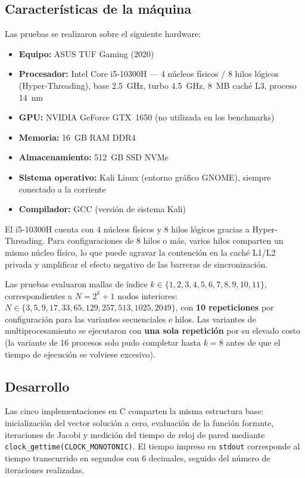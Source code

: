 \documentclass{article}
\begin{document}
\subsection{Características de la máquina}

Las pruebas se realizaron sobre el siguiente hardware:

\begin{itemize}
  \item \textbf{Equipo:} ASUS TUF Gaming (2020)
  \item \textbf{Procesador:} Intel Core i5-10300H --- 4 núcleos físicos / 8
    hilos lógicos (Hyper-Threading), base 2.5~GHz, turbo 4.5~GHz, 8~MB caché
    L3, proceso 14~nm
  \item \textbf{GPU:} NVIDIA GeForce GTX~1650 (no utilizada en los benchmarks)
  \item \textbf{Memoria:} 16~GB RAM DDR4
  \item \textbf{Almacenamiento:} 512~GB SSD NVMe
  \item \textbf{Sistema operativo:} Kali Linux (entorno gráfico GNOME), siempre
    conectado a la corriente
  \item \textbf{Compilador:} GCC (versión de sistema Kali)
\end{itemize}

El i5-10300H cuenta con 4 núcleos físicos y 8 hilos lógicos gracias a
Hyper-Threading.  Para configuraciones de 8 hilos o más, varios hilos comparten
un mismo núcleo físico, lo que puede agravar la contención en la caché L1/L2
privada y amplificar el efecto negativo de las barreras de sincronización.

Las pruebas evaluaron mallas de índice $k \in \{1, 2, 3, 4, 5, 6, 7, 8, 9, 10, 11\}$, correspondientes a $N = 2^k + 1$ nodos interiores:
$N \in \{3, 5, 9, 17, 33, 65, 129, 257, 513, 1025, 2049\}$,
con \textbf{10 repeticiones} por configuración para las variantes secuenciales e
hilos.  Las variantes de multiprocesamiento se ejecutaron con \textbf{una sola
repetición} por su elevado costo (la variante de 16 procesos solo pudo completar
hasta $k=8$ antes de que el tiempo de ejecución se volviese excesivo).

\subsection{Desarrollo}

Las cinco implementaciones en C comparten la misma estructura base: inicialización del vector solución a cero, evaluación de la función forzante, iteraciones de Jacobi y medición del tiempo de reloj de pared mediante \texttt{clock\_gettime(CLOCK\_MONOTONIC)}.  El tiempo impreso en \texttt{stdout} corresponde al tiempo transcurrido en segundos con 6 decimales, seguido del número de iteraciones realizadas.
\end{document}
